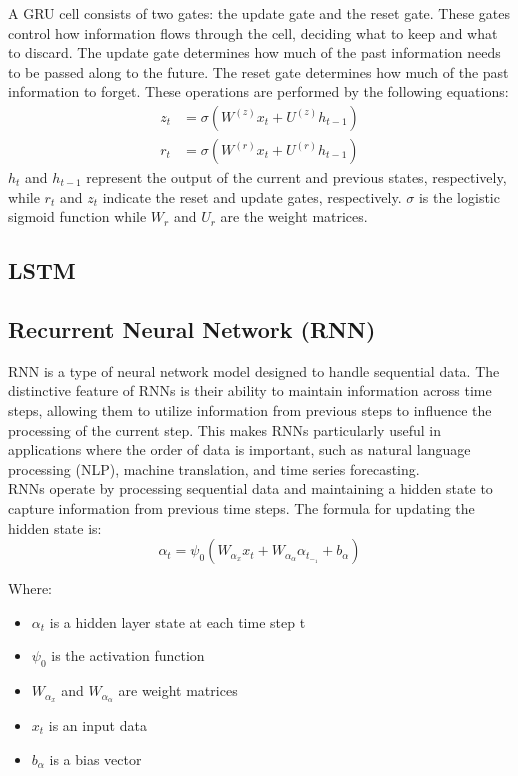 \documentclass{ieeeojies}
\begin{document}
A GRU cell consists of two gates: the update gate and the reset gate. These gates control how information flows through the cell, deciding what to keep and what to discard. The update gate determines how much of the past information needs to be passed along to the future. The reset gate determines how much of the past information to forget. These operations are performed by the following equations:
\begin{align*}
z_t &= \sigma\left( W^{(z)} x_t + U^{(z)} h_{t-1} \right) \\
r_t &= \sigma\left( W^{(r)} x_t + U^{(r)} h_{t-1} \right)
\end{align*}
\(h_t\) and \(h_{t-1}\) represent the output of the current and previous states, respectively, while \(r_t\) and \(z_t\) indicate the reset and update gates, respectively. \(\sigma\) is the logistic sigmoid function while \(W_r\) and \(U_r\) are the weight matrices.


\subsection{LSTM} 


\subsection{Recurrent Neural Network (RNN)}
RNN is a type of neural network model designed to handle sequential data. The distinctive feature of RNNs is their ability to maintain information across time steps, allowing them to utilize information from previous steps to influence the processing of the current step. This makes RNNs particularly useful in applications where the order of data is important, such as natural language processing (NLP), machine translation, and time series forecasting. \\
RNNs operate by processing sequential data and maintaining a hidden state to capture information from previous time steps. The formula for updating the hidden state is:
\[ \alpha_t=\psi_0(W_\alpha_xx_t + W_\alpha_\alpha\alpha_t_-_1 + b_\alpha) \]

Where:\\
    \begin{itemize}
        \item $\alpha_t$ is a hidden layer state at each time step t
        \item $\psi_0$ is the activation function
        \item $W_\alpha_x$ and $W_\alpha_\alpha$ are weight matrices
        \item $x_t$ is an input data
        \item $b_\alpha$ is a bias vector
    \end{itemize}\\
\end{document}
